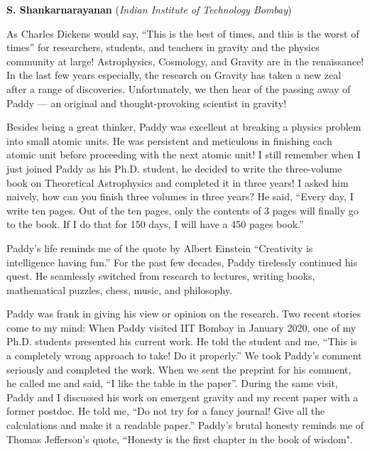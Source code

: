 \documentclass[prd, preprint, longbibliography, 12pt]{revtex4-2}
\begin{document}
\bigskip

\bigskip

\centerline{{\bf S. Shankarnarayanan} ({\it Indian Institute of Technology Bombay})}
\medskip
{}

As Charles Dickens would say, “This is the best of times, and this is the worst of times” for researchers, students, and teachers in gravity and the physics community at large! Astrophysics, Cosmology, and Gravity are in the renaissance! In the last few years especially, the research on Gravity has taken a new zeal after a range of discoveries. Unfortunately, we then hear  of the passing away of Paddy --- an original and thought-provoking scientist in gravity!  

Besides being a great thinker, Paddy was excellent at breaking a physics problem into small atomic units. He was persistent and meticulous in finishing each atomic unit before proceeding with the next atomic unit! I still remember when I just joined Paddy as his Ph.D. student, he decided to write the three-volume book on Theoretical Astrophysics and completed it in three years! I asked him naively, how can you finish three volumes in three years? He said, “Every day, I write ten pages. Out of the ten pages, only the contents of 3 pages will finally go to the book. If I do that for 150 days, I will have a 450 pages book.” 

Paddy’s life reminds me of the quote by Albert Einstein “Creativity is intelligence having fun.” For the past few decades, Paddy tirelessly continued his quest.  He seamlessly switched from research to lectures, writing books, mathematical puzzles, chess, music, and philosophy.  

Paddy was frank in giving his view or opinion on the research. Two recent stories come to my mind: When Paddy visited IIT Bombay in January 2020, one of my Ph.D. students presented his current work. He told the student and me, “This is a completely wrong approach to take! Do it properly.” We took Paddy’s comment seriously and completed the work. When we sent the preprint for his comment, he called me and said, “I like the table in the paper”. During the same visit, Paddy and I discussed his work on emergent gravity and my recent paper with a former postdoc. He told me, “Do not try for a fancy journal! Give all the calculations and make it a readable paper.” Paddy’s brutal honesty reminds me of Thomas Jefferson’s quote, “Honesty is the first chapter in the book of wisdom".
\end{document}
